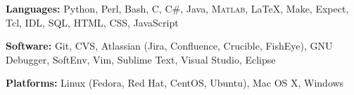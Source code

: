 

\textbf{Languages:} Python, Perl, Bash, C, C\#, Java, \textsc{Matlab}, \LaTeX, Make, Expect, Tcl, IDL, SQL, HTML, CSS, JavaScript

\vspace{5pt}

\textbf{Software:} Git, CVS, Atlassian (Jira, Confluence, Crucible, FishEye), GNU Debugger, SoftEnv, Vim, Sublime Text, Visual Studio, Eclipse

\vspace{5pt}

\textbf{Platforms:} Linux (Fedora, Red Hat, CentOS, Ubuntu), Mac OS X, Windows
